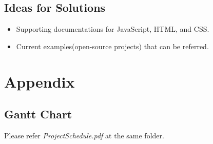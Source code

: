 \documentclass[12pt, titlepage]{article}
\begin{document}
\subsection{Ideas for Solutions}
\begin{itemize}
    \item Supporting documentations for JavaScript, HTML, and CSS.
    \item Current examples(open-source projects) that can be referred.
\end{itemize}

\section{Appendix}
\subsection{Gantt Chart}
Please refer \textit{ProjectSchedule.pdf} at the same folder.

\printbibliography
\end{document}
